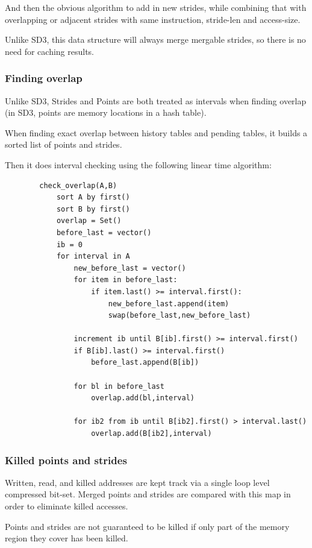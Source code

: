 \documentclass[12pt,twoside]{reedthesis}
\begin{document}
		And then the obvious algorithm to add in new strides, while combining that with overlapping or adjacent strides with same instruction, stride-len and access-size.

		Unlike SD3, this data structure will always merge mergable strides, so there is no need for caching results.

		\subsubsection{Finding overlap}

		Unlike SD3, Strides and Points are both treated as intervals when finding overlap (in SD3, points are memory locations in a hash table).

		When finding exact overlap between history tables and pending tables, it builds a sorted list of points and strides.

		Then it does interval checking using the following linear time algorithm:

		\begin{verbatim}
		check_overlap(A,B)
		    sort A by first()
		    sort B by first()
		    overlap = Set()
		    before_last = vector()
		    ib = 0
		    for interval in A
		        new_before_last = vector()
		        for item in before_last:
		            if item.last() >= interval.first():
		                new_before_last.append(item)
		                swap(before_last,new_before_last)

		        increment ib until B[ib].first() >= interval.first()
		        if B[ib].last() >= interval.first()
		            before_last.append(B[ib])

		        for bl in before_last
		            overlap.add(bl,interval)

		        for ib2 from ib until B[ib2].first() > interval.last()
		            overlap.add(B[ib2],interval)
		\end{verbatim}

		\subsubsection{Killed points and strides}

		Written, read, and killed addresses are kept track via a single loop level compressed bit-set. Merged points and strides are compared with this map in order to eliminate killed accesses.

		Points and strides are not guaranteed to be killed if only part of the memory region they cover has been killed.
\end{document}

